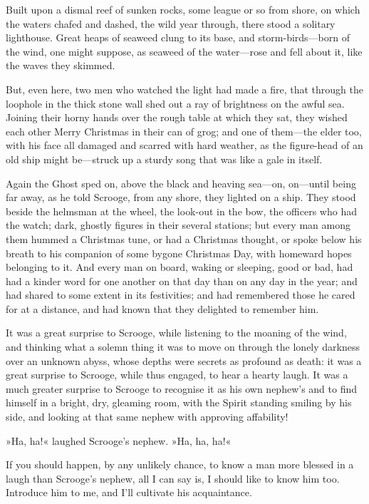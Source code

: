 Built upon a dismal reef of sunken rocks, some league or so from shore, on which the waters chafed and dashed, the wild year through, there stood a solitary lighthouse. Great heaps of seaweed clung to its base, and storm-birds—born of the wind, one might suppose, as seaweed of the water—rose and fell about it, like the waves they skimmed.

But, even here, two men who watched the light had made a fire, that through the loophole in the thick stone wall shed out a ray of brightness on the awful sea. Joining their horny hands over the rough table at which they sat, they wished each other Merry Christmas in their can of grog; and one of them—the elder too, with his face all damaged and scarred with hard weather, as the figure-head of an old ship might be—struck up a sturdy song that was like a gale in itself.

Again the Ghost sped on, above the black and heaving sea—on, on—until being far away, as he told Scrooge, from any shore, they lighted on a ship. They stood beside the helmsman at the wheel, the look-out in the bow, the officers who had the watch; dark, ghostly figures in their several stations; but every man among them hummed a Christmas tune, or had a Christmas thought, or spoke below his breath to his companion of some bygone Christmas Day, with homeward hopes belonging to it. And every man on board, waking or sleeping, good or bad, had had a kinder word for one another on that day than on any day in the year; and had shared to some extent in its festivities; and had remembered those he cared for at a distance, and had known that they delighted to remember him.

It was a great surprise to Scrooge, while listening to the moaning of the wind, and thinking what a solemn thing it was to move on through the lonely darkness over an unknown abyss, whose depths were secrets as profound as death: it was a great surprise to Scrooge, while thus engaged, to hear a hearty laugh. It was a much greater surprise to Scrooge to recognise it as his own  nephew's and to find himself in a bright, dry, gleaming room, with the Spirit standing smiling by his side, and looking at that same nephew with approving affability!

»Ha, ha!« laughed Scrooge's nephew. »Ha, ha, ha!«

If you should happen, by any unlikely chance, to know a man more blessed in a laugh than Scrooge's nephew, all I can say is, I should like to know him too. Introduce him to me, and I'll cultivate his acquaintance.

